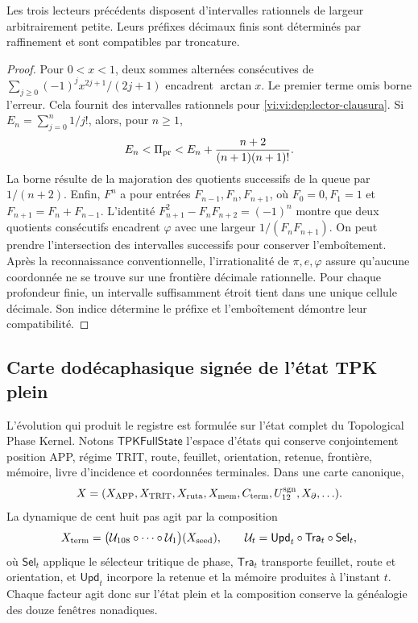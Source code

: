 \begin{proposition}
\label{vi:vi:dep:prefijos}
Les trois lecteurs précédents disposent d’intervalles rationnels de largeur
arbitrairement petite. Leurs préfixes décimaux finis sont déterminés par
raffinement et sont compatibles par troncature.
\end{proposition}
\begin{proof}
Pour \(0<x<1\), deux sommes alternées consécutives de
\(\sum_{j\ge0}(-1)^jx^{2j+1}/(2j+1)\) encadrent \(\arctan x\).
Le premier terme omis borne l’erreur. Cela fournit des intervalles
rationnels pour \eqref{vi:vi:dep:lector-clausura}.
Si \(E_n=\sum_{j=0}^n1/j!\), alors, pour \(n\ge1\),
\[
 E_n<\Pi_{\rm pr}<E_n+
 \frac{n+2}{(n+1)(n+1)!}.
\]
La borne résulte de la majoration des quotients successifs de la queue par
\(1/(n+2)\). Enfin, \(F^n\) a pour entrées
\(F_{n-1},F_n,F_{n+1}\), où \(F_0=0,F_1=1\) et
\(F_{n+1}=F_n+F_{n-1}\). L’identité
\(F_{n+1}^2-F_nF_{n+2}=(-1)^n\) montre que deux quotients consécutifs
encadrent \(\varphi\) avec une largeur \(1/(F_nF_{n+1})\).
On peut prendre l’intersection des intervalles successifs pour conserver
l’emboîtement. Après la reconnaissance conventionnelle, l’irrationalité de
\(\pi,e,\varphi\) assure qu’aucune coordonnée ne se trouve sur une frontière
décimale rationnelle. Pour chaque profondeur finie, un intervalle
suffisamment étroit tient dans une unique cellule décimale. Son indice
détermine le préfixe et l’emboîtement démontre leur compatibilité.
\end{proof}

\subsection{Carte dodécaphasique signée de l'état TPK plein}
\label{vi:vi:dep:estado-pleno}

L'évolution qui produit le registre est formulée sur l'état complet du
Topological Phase Kernel. Notons
\(\mathsf{TPKFullState}\) l'espace d'états qui conserve conjointement
position APP, régime TRIT, route, feuillet, orientation, retenue, frontière,
mémoire, livre d'incidence et coordonnées terminales. Dans une carte canonique,
\[
 X=(X_{\rm APP},X_{\rm TRIT},X_{\rm ruta},X_{\rm mem},
       C_{\rm term},U_{12}^{\rm sgn},X_{\partial},\ldots).
\]
La dynamique de cent huit pas agit par la composition
\begin{equation}
 X_{\rm term}
 =\bigl(\mathcal U_{108}\circ\cdots\circ\mathcal U_1\bigr)(X_{\rm seed}),
 \qquad
 \mathcal U_t=\mathsf{Upd}_t\circ\mathsf{Tra}_t\circ\mathsf{Sel}_t,
 \label{vi:vi:dep:estado-terminal-108}
\end{equation}
où \(\mathsf{Sel}_t\) applique le sélecteur tritique de phase,
\(\mathsf{Tra}_t\) transporte feuillet, route et orientation, et
\(\mathsf{Upd}_t\) incorpore la retenue et la mémoire produites à
l’instant \(t\). Chaque facteur agit donc sur l’état plein et la
composition conserve la généalogie des douze fenêtres nonadiques.

